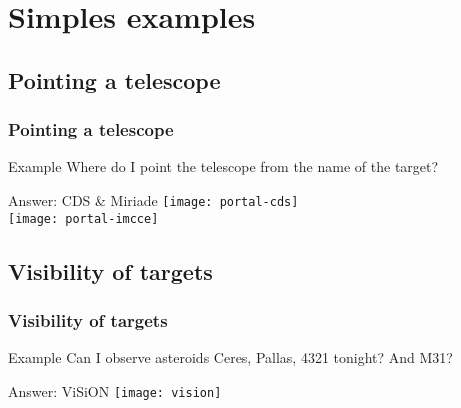 \section{Simples examples}

\subsection{Pointing a telescope}
\begin{frame}
  \frametitle{Pointing a telescope}

  \begin{exampleblock}{Example}
    Where do I point the telescope from the name of the target?
  \end{exampleblock}

  \begin{block}{Answer: CDS \& Miriade}
    \hspace{.10\textwidth}\texttt{[image: portal-cds]}\\
    \hspace{.40\textwidth}\texttt{[image: portal-imcce]}
  \end{block}

\end{frame}



\subsection{Visibility of targets}
\begin{frame}
  \frametitle{Visibility of targets}

  \begin{exampleblock}{Example}
    Can I observe asteroids Ceres, Pallas, 4321 tonight? And M31?
  \end{exampleblock}

  \begin{block}{Answer: ViSiON}
    \hspace{.25\textwidth}\texttt{[image: vision]}
  \end{block}

\end{frame}



